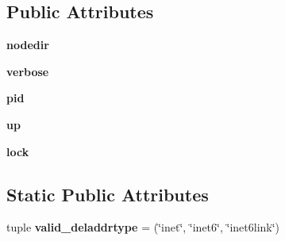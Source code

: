\subsection*{Public Attributes}
\begin{DoxyCompactItemize}
\item 
\hypertarget{classcore_1_1bsd_1_1vnode_1_1_simple_jail_node_a246652d271492c2b72d1b11117855a0b}{{\bfseries nodedir}}\label{classcore_1_1bsd_1_1vnode_1_1_simple_jail_node_a246652d271492c2b72d1b11117855a0b}

\item 
\hypertarget{classcore_1_1bsd_1_1vnode_1_1_simple_jail_node_ab9729ff4f085475586d4482e26bec687}{{\bfseries verbose}}\label{classcore_1_1bsd_1_1vnode_1_1_simple_jail_node_ab9729ff4f085475586d4482e26bec687}

\item 
\hypertarget{classcore_1_1bsd_1_1vnode_1_1_simple_jail_node_a2037c4aa50327a57e6b645e4f6df6d21}{{\bfseries pid}}\label{classcore_1_1bsd_1_1vnode_1_1_simple_jail_node_a2037c4aa50327a57e6b645e4f6df6d21}

\item 
\hypertarget{classcore_1_1bsd_1_1vnode_1_1_simple_jail_node_a939882d0aadc9b258bcab2e884ada545}{{\bfseries up}}\label{classcore_1_1bsd_1_1vnode_1_1_simple_jail_node_a939882d0aadc9b258bcab2e884ada545}

\item 
\hypertarget{classcore_1_1bsd_1_1vnode_1_1_simple_jail_node_a04233da9151cd5c3ab9dafa801c94d0a}{{\bfseries lock}}\label{classcore_1_1bsd_1_1vnode_1_1_simple_jail_node_a04233da9151cd5c3ab9dafa801c94d0a}

\end{DoxyCompactItemize}
\subsection*{Static Public Attributes}
\begin{DoxyCompactItemize}
\item 
\hypertarget{classcore_1_1bsd_1_1vnode_1_1_simple_jail_node_a82131b96e714dd3a8e132dc72eeaba47}{tuple {\bfseries valid\+\_\+deladdrtype} = (\char`\"{}inet\char`\"{}, \char`\"{}inet6\char`\"{}, \char`\"{}inet6link\char`\"{})}\label{classcore_1_1bsd_1_1vnode_1_1_simple_jail_node_a82131b96e714dd3a8e132dc72eeaba47}

\end{DoxyCompactItemize}


